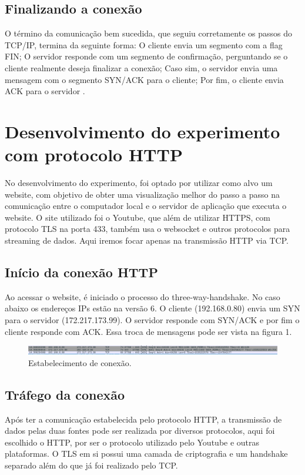\documentclass[12pt]{article}
\begin{document}
\subsection{Finalizando a conexão}
O término da comunicação bem sucedida, que seguiu corretamente os passos do TCP/IP, termina da seguinte forma: O cliente envia um segmento com a flag FIN; O servidor responde com um segmento de confirmação, perguntando se o cliente realmente deseja finalizar a conexão; Caso sim, o servidor envia uma mensagem com o segmento SYN/ACK para o cliente; Por fim, o cliente envia ACK para o servidor \cite{gitbook}.

\section{Desenvolvimento do experimento com protocolo HTTP}

No desenvolvimento do experimento, foi optado por utilizar como alvo um website, com objetivo de obter uma visualização melhor do passo a passo na comunicação entre o computador local e o servidor de aplicação que executa o website. O site utilizado foi o Youtube, que além de utilizar HTTPS, com protocolo TLS na porta 433, também usa o websocket e outros protocolos para streaming de dados. Aqui iremos focar apenas na transmissão HTTP via TCP.

\subsection{Início da conexão HTTP}

Ao acessar o website, é iniciado o processo do three-way-handshake. No caso abaixo os endereços IPs estão na versão 6. O cliente (192.168.0.80) envia um SYN para o servidor (172.217.173.99). O servidor responde com SYN/ACK e por fim o cliente responde com ACK. Essa troca de mensagens pode ser vista na figura 1.

\begin{figure}[H]
    \centering
    \includegraphics[width=\linewidth]{inicio.png}
    \caption{Estabelecimento de conexão.}
\end{figure}

\subsection{Tráfego da conexão}

Após ter a comunicação estabelecida pelo protocolo HTTP, a transmissão de dados pelas duas fontes pode ser realizada por diversos protocolos, aqui foi escolhido o HTTP, por ser o protocolo utilizado pelo Youtube e outras plataformas. O TLS em si possui uma camada de criptografia e um handshake separado além do que já foi realizado pelo TCP.
\end{document}
